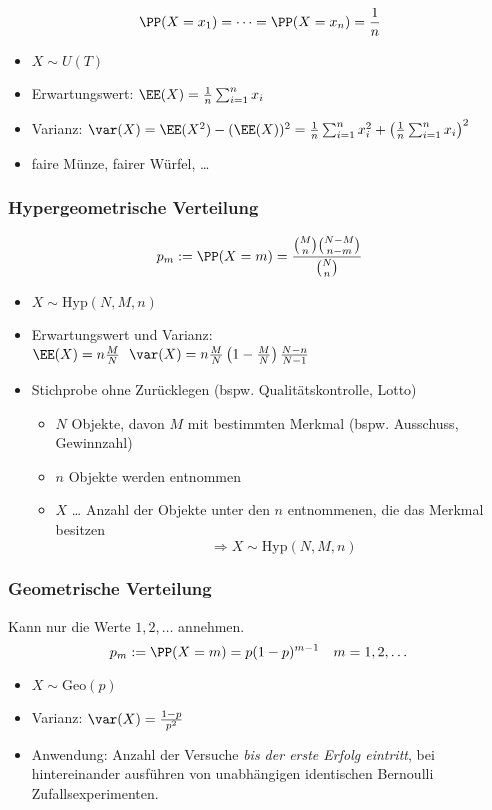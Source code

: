\documentclass{scrreprt}
\begin{document}
$$\PP(X=x_1) = \dots = \PP(X=x_n) = \frac{1}{n}$$

\begin{itemize}
\item $X\sim U(T)$
\item Erwartungswert: $\EE(X)=\frac{1}{n}\sum_{i=1}^n x_i$
\item Varianz: $\var(X)=\EE(X^2)-(\EE(X))^2 = \frac{1}{n} \sum_{i=1}^n x_i^2+\left(\frac{1}{n}\sum_{i=1}^n x_i\right)^2$
\item faire Münze, fairer Würfel, …
\end{itemize}

\subsubsection{Hypergeometrische Verteilung}
$$p_m:=\PP(X=m)=\frac{\binom{M}{n}\binom{N-M}{n-m}}{\binom{N}{n}}$$

\begin{itemize}
\item $X\sim \mathrm{Hyp}(N,M,n)$
\item Erwartungswert und Varianz: \\
$\EE(X)=n\frac{M}{N}$\
$\var (X)=n\frac{M}{N}\left(1-\frac{M}{N}\right) \frac{N-n}{N-1}$
\item Stichprobe ohne Zurücklegen (bspw. Qualitätskontrolle, Lotto)
\begin{itemize}
\item $N$ Objekte, davon $M$ mit bestimmten Merkmal (bspw. Ausschuss, Gewinnzahl)
\item $n$ Objekte werden entnommen
\item $X$ … Anzahl der Objekte unter den $n$ entnommenen, die das Merkmal besitzen
$$\Rightarrow X\sim \mathrm{Hyp}(N,M,n)$$
\end{itemize}
\end{itemize}

\subsubsection{Geometrische Verteilung}
Kann nur die Werte $1,2,\dots$ annehmen.
$$p_m:=\PP(X=m)=p(1-p)^{m-1} \quad m=1,2,\dots$$
\begin{itemize}
\item $X\sim \mathrm{Geo}(p)$
\item Varianz: $\var(X)=\frac{1-p}{p^2}$
\item Anwendung: Anzahl der Versuche \emph{bis der erste Erfolg eintritt}, bei hintereinander ausführen von unabhängigen identischen Bernoulli Zufallsexperimenten.
\end{itemize}
\end{document}
